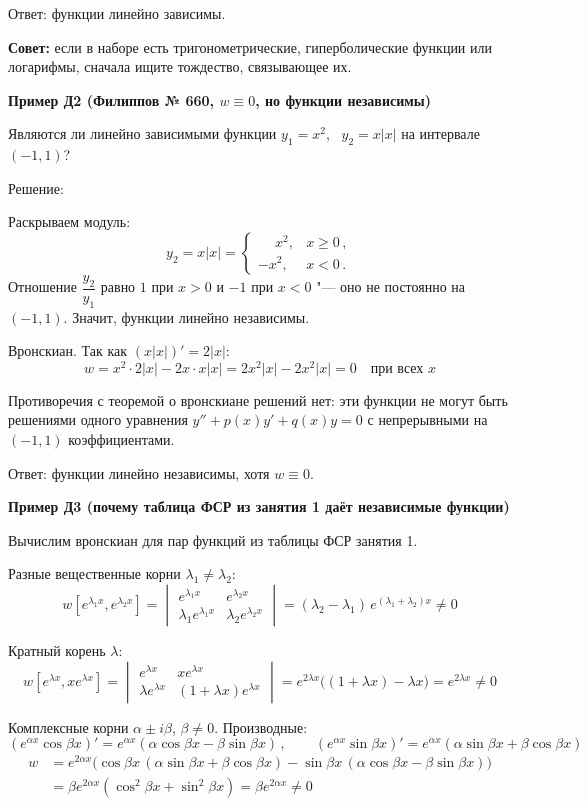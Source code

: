 \documentclass[11pt,a4paper]{article}
\newcommand{\example}[1]{\par\medskip\noindent\textbf{#1}\par\nopagebreak\smallskip}
\begin{document}
Ответ: функции линейно зависимы.

\textbf{Совет:} если в наборе есть тригонометрические, гиперболические функции или логарифмы, сначала ищите тождество, связывающее их.

\example{Пример Д2 (Филиппов № 660, $w \equiv 0$, но функции независимы)}

Являются ли линейно зависимыми функции $y_1 = x^2$, \ $y_2 = x|x|$ на интервале $(-1, 1)$?

Решение:

Раскрываем модуль:
\[
  y_2 = x|x| =
  \begin{cases}
    \phantom{-}x^2, & x \ge 0\,,\\
    -x^2, & x < 0\,.
  \end{cases}
\]
Отношение $\dfrac{y_2}{y_1}$ равно $1$ при $x > 0$ и $-1$ при $x < 0$ "--- оно не постоянно на $(-1, 1)$. Значит, функции линейно независимы.

Вронскиан. Так как $(x|x|)' = 2|x|$:
\[
  w = x^2 \cdot 2|x| - 2x \cdot x|x| = 2x^2|x| - 2x^2|x| = 0 \quad\text{при всех } x
\]

Противоречия с теоремой о вронскиане решений нет: эти функции не могут быть решениями одного уравнения $y'' + p(x)y' + q(x)y = 0$ с непрерывными на $(-1, 1)$ коэффициентами.

Ответ: функции линейно независимы, хотя $w \equiv 0$.

\example{Пример Д3 (почему таблица ФСР из занятия 1 даёт независимые функции)}

Вычислим вронскиан для пар функций из таблицы ФСР занятия 1.

Разные вещественные корни $\lambda_1 \ne \lambda_2$:
\[
  w[e^{\lambda_1 x}, e^{\lambda_2 x}] =
  \begin{vmatrix} e^{\lambda_1 x} & e^{\lambda_2 x} \\ \lambda_1 e^{\lambda_1 x} & \lambda_2 e^{\lambda_2 x} \end{vmatrix}
  = (\lambda_2 - \lambda_1)\, e^{(\lambda_1 + \lambda_2)x} \ne 0
\]

Кратный корень $\lambda$:
\[
  w[e^{\lambda x}, x e^{\lambda x}] =
  \begin{vmatrix} e^{\lambda x} & x e^{\lambda x} \\ \lambda e^{\lambda x} & (1 + \lambda x) e^{\lambda x} \end{vmatrix}
  = e^{2\lambda x}\bigl((1 + \lambda x) - \lambda x\bigr) = e^{2\lambda x} \ne 0
\]

Комплексные корни $\alpha \pm i\beta$, $\beta \ne 0$. Производные:
\[
  (e^{\alpha x}\cos\beta x)' = e^{\alpha x}(\alpha\cos\beta x - \beta\sin\beta x)\,, \qquad
  (e^{\alpha x}\sin\beta x)' = e^{\alpha x}(\alpha\sin\beta x + \beta\cos\beta x)
\]
\[
\begin{aligned}
  w &= e^{2\alpha x}\bigl(\cos\beta x\,(\alpha\sin\beta x + \beta\cos\beta x) - \sin\beta x\,(\alpha\cos\beta x - \beta\sin\beta x)\bigr)\\
    &= \beta e^{2\alpha x}(\cos^2\beta x + \sin^2\beta x) = \beta e^{2\alpha x} \ne 0
\end{aligned}
\]
\end{document}

